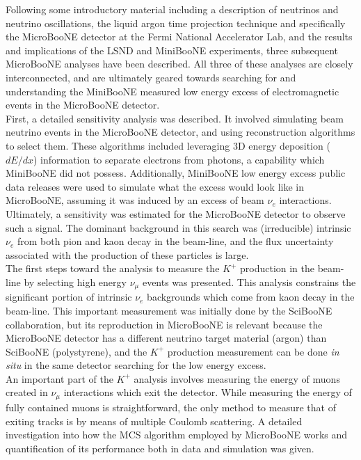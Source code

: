 Following some introductory material including a description of neutrinos and neutrino oscillations, the liquid argon time projection technique and specifically the MicroBooNE detector at the Fermi National Accelerator Lab, and the results and implications of the LSND and MiniBooNE experiments, three subsequent MicroBooNE analyses have been described. All three of these analyses are closely interconnected, and are ultimately geared towards searching for and understanding the MiniBooNE measured low energy excess of electromagnetic events in the MicroBooNE detector.\\

First, a detailed sensitivity analysis was described. It involved simulating beam neutrino events in the MicroBooNE detector, and using reconstruction algorithms to select them. These algorithms included leveraging 3D energy deposition ($dE/dx$) information to separate electrons from photons, a capability which MiniBooNE did not possess. Additionally, MiniBooNE low energy excess public data releases were used to simulate what the excess would look like in MicroBooNE, assuming it was induced by an excess of beam $\nu_e$ interactions. Ultimately, a sensitivity was estimated for the MicroBooNE detector to observe such a signal. The dominant background in this search was (irreducible) intrinsic $\nu_e$ from both pion and kaon decay in the beam-line, and the flux uncertainty associated with the production of these particles is large.\\

The first steps toward the analysis to measure the $K^+$ production in the beam-line by selecting high energy $\nu_\mu$ events was presented. This analysis constrains the significant portion of intrinsic $\nu_e$ backgrounds which come from kaon decay in the beam-line. This important measurement was initially done by the SciBooNE collaboration, but its reproduction in MicroBooNE is relevant because the MicroBooNE detector has a different neutrino target material (argon) than SciBooNE (polystyrene), and the $K^+$ production measurement can be done \textit{in situ} in the same detector searching for the low energy excess.\\

An important part of the $K^+$ analysis involves measuring the energy of muons created in $\nu_\mu$ interactions which exit the detector. While measuring the energy of fully contained muons is straightforward, the only method to measure that of exiting tracks is by means of multiple Coulomb scattering. A detailed investigation into how the MCS algorithm employed by MicroBooNE works and quantification of its performance both in data and simulation was given.\\

